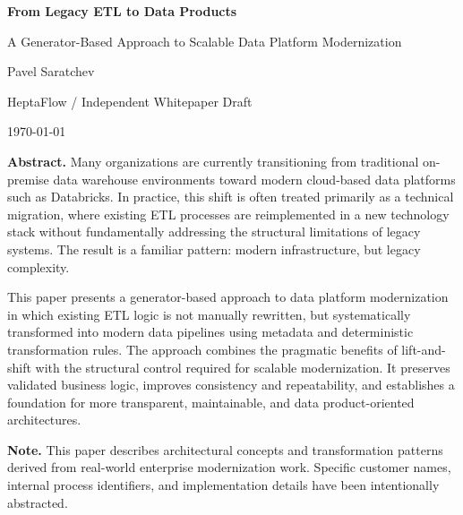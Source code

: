\documentclass[11pt,a4paper]{article}
\newcommand{\papertitle}{From Legacy ETL to Data Products}
\newcommand{\papersubtitle}{A Generator-Based Approach to Scalable Data Platform Modernization}
\newcommand{\paperauthor}{Pavel Saratchev}
\newcommand{\paperaffiliation}{HeptaFlow / Independent Whitepaper Draft}
\newcommand{\paperdate}{\today}
\begin{document}
\begin{titlepage}
  \centering
  \vspace*{2.5cm}

  {\Huge\bfseries \papertitle \par}
  \vspace{0.6cm}
  {\Large \papersubtitle \par}

  \vspace{2.0cm}

  {\large \paperauthor \par}
  \vspace{0.2cm}
  {\normalsize \paperaffiliation \par}
  \vspace{0.2cm}
  {\normalsize \paperdate \par}

  \vfill

  \begin{minipage}{0.88\textwidth}
  \small
  \textbf{Abstract.}
  Many organizations are currently transitioning from traditional on-premise data warehouse environments toward modern cloud-based data platforms such as Databricks. In practice, this shift is often treated primarily as a technical migration, where existing ETL processes are reimplemented in a new technology stack without fundamentally addressing the structural limitations of legacy systems. The result is a familiar pattern: modern infrastructure, but legacy complexity.

  This paper presents a generator-based approach to data platform modernization in which existing ETL logic is not manually rewritten, but systematically transformed into modern data pipelines using metadata and deterministic transformation rules. The approach combines the pragmatic benefits of lift-and-shift with the structural control required for scalable modernization. It preserves validated business logic, improves consistency and repeatability, and establishes a foundation for more transparent, maintainable, and data product-oriented architectures.
  \end{minipage}

  \vfill

  \begin{minipage}{0.88\textwidth}
  \footnotesize
  \textbf{Note.}
  This paper describes architectural concepts and transformation patterns derived from real-world enterprise modernization work. Specific customer names, internal process identifiers, and implementation details have been intentionally abstracted.
  \end{minipage}
\end{titlepage}
\end{document}
